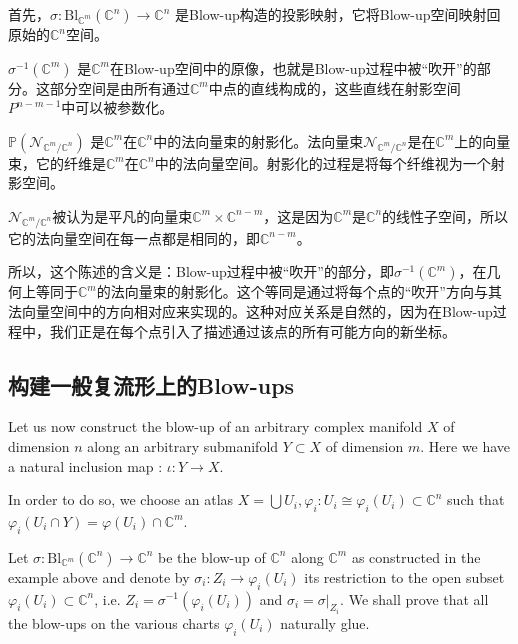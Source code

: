 \begin{remark}
    首先，$\sigma: \mathrm{Bl}_{\mathbb{C}^m}\left(\mathbb{C}^n\right) \rightarrow \mathbb{C}^n$ 是Blow-up构造的投影映射，它将Blow-up空间映射回原始的$\mathbb{C}^n$空间。

    $\sigma^{-1}\left(\mathbb{C}^m\right)$ 是$\mathbb{C}^m$在Blow-up空间中的原像，也就是Blow-up过程中被“吹开”的部分。这部分空间是由所有通过$\mathbb{C}^m$中点的直线构成的，这些直线在射影空间$P^{n-m-1}$中可以被参数化。

    $\mathbb{P}\left(\mathcal{N}_{\mathbb{C}^m / \mathbb{C}^n}\right)$ 是$\mathbb{C}^m$在$\mathbb{C}^n$中的法向量束的射影化。法向量束$\mathcal{N}_{\mathbb{C}^m / \mathbb{C}^n}$是在$\mathbb{C}^m$上的向量束，它的纤维是$\mathbb{C}^m$在$\mathbb{C}^n$中的法向量空间。射影化的过程是将每个纤维视为一个射影空间。

    $\mathcal{N}_{\mathbb{C}^m / \mathbb{C}^n}$被认为是平凡的向量束$\mathbb{C}^m \times \mathbb{C}^{n-m}$，这是因为$\mathbb{C}^m$是$\mathbb{C}^n$的线性子空间，所以它的法向量空间在每一点都是相同的，即$\mathbb{C}^{n-m}$。

    所以，这个陈述的含义是：Blow-up过程中被“吹开”的部分，即$\sigma^{-1}\left(\mathbb{C}^m\right)$，在几何上等同于$\mathbb{C}^m$的法向量束的射影化。这个等同是通过将每个点的“吹开”方向与其法向量空间中的方向相对应来实现的。这种对应关系是自然的，因为在Blow-up过程中，我们正是在每个点引入了描述通过该点的所有可能方向的新坐标。
\end{remark}


\subsection{构建一般复流形上的Blow-ups}

Let us now construct the blow-up of an arbitrary complex manifold $X$ of dimension $n$ along an arbitrary submanifold $Y \subset X$ of dimension $m$. Here we have a natural inclusion map : $\iota\colon Y\to X$.

In order to do so, we choose an atlas $X=\bigcup U_i, \varphi_i: U_i \cong \varphi_i\left(U_i\right) \subset \mathbb{C}^n$ such that $\varphi_i\left(U_i \cap Y\right)=\varphi\left(U_i\right) \cap \mathbb{C}^m$.

Let $\sigma: \mathrm{Bl}_{\mathbb{C}^m}\left(\mathbb{C}^n\right) \rightarrow \mathbb{C}^n$ be the blow-up of $\mathbb{C}^n$ along $\mathbb{C}^m$ as constructed in the example above and denote by $\sigma_i: Z_i \rightarrow \varphi_i\left(U_i\right)$ its restriction to the open subset $\varphi_i\left(U_i\right) \subset \mathbb{C}^n$, i.e. $Z_i=\sigma^{-1}\left(\varphi_i\left(U_i\right)\right)$ and $\sigma_i=\left.\sigma\right|_{Z_i}$. We shall prove that all the blow-ups on the various charts $\varphi_i\left(U_i\right)$ naturally glue.

